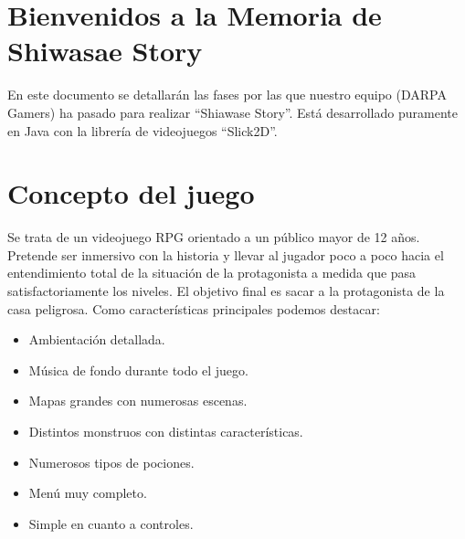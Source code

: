 \section{Bienvenidos a la Memoria de Shiwasae Story}
En este documento se detallarán las fases por las que nuestro equipo (DARPA Gamers) ha pasado para realizar “Shiawase Story”. Está desarrollado puramente en Java con la librería de videojuegos “Slick2D”.\newline
\newline
\section{Concepto del juego}
Se trata de un videojuego RPG orientado a un público mayor de 12 años. Pretende ser inmersivo con la historia y llevar al jugador poco a poco hacia el entendimiento total de la situación de la protagonista a medida que pasa satisfactoriamente los niveles. El objetivo final es sacar a la protagonista de la casa peligrosa.\newline
\newline
Como características principales podemos destacar: 
\begin{itemize}
    \item Ambientación detallada.
    \item Música de fondo durante todo el juego.
    \item Mapas grandes con numerosas escenas.
    \item Distintos monstruos con distintas características.
    \item Numerosos tipos de pociones. 
    \item Menú muy completo.
    \item Simple en cuanto a controles.
\end{itemize}
